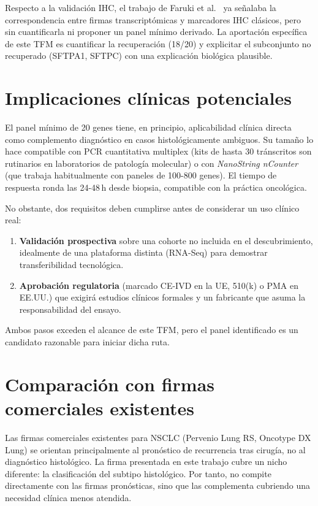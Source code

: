 Respecto a la validación IHC, el trabajo de Faruki et
al.~\cite{faruki2017lung} ya señalaba la correspondencia entre firmas
transcriptómicas y marcadores IHC clásicos, pero sin cuantificarla ni
proponer un panel mínimo derivado. La aportación específica de este TFM
es cuantificar la recuperación (18/20) y explicitar el subconjunto no
recuperado (SFTPA1, SFTPC) con una explicación biológica plausible.

\section{Implicaciones clínicas potenciales}
\label{sec:disc_clinico}

El panel mínimo de 20 genes tiene, en principio, aplicabilidad clínica
directa como complemento diagnóstico en casos histológicamente ambiguos.
Su tamaño lo hace compatible con PCR cuantitativa multiplex (kits de hasta
30 tránscritos son rutinarios en laboratorios de patología molecular) o
con \emph{NanoString nCounter} (que trabaja habitualmente con paneles de
100-800 genes). El tiempo de respuesta ronda las 24-48\,h desde biopsia,
compatible con la práctica oncológica.

No obstante, dos requisitos deben cumplirse antes de considerar un uso
clínico real:

\begin{enumerate}
  \item \textbf{Validación prospectiva} sobre una cohorte no incluida en
  el descubrimiento, idealmente de una plataforma distinta (RNA-Seq) para
  demostrar transferibilidad tecnológica.
  \item \textbf{Aprobación regulatoria} (marcado CE-IVD en la UE, 510(k)
  o PMA en EE.UU.) que exigirá estudios clínicos formales y un
  fabricante que asuma la responsabilidad del ensayo.
\end{enumerate}

Ambos pasos exceden el alcance de este TFM, pero el panel identificado es
un candidato razonable para iniciar dicha ruta.

\section{Comparación con firmas comerciales existentes}
\label{sec:disc_comerciales}

Las firmas comerciales existentes para NSCLC (Pervenio Lung RS, Oncotype
DX Lung) se orientan principalmente al pronóstico de recurrencia tras
cirugía, no al diagnóstico histológico. La firma presentada en este
trabajo cubre un nicho diferente: la clasificación del subtipo
histológico. Por tanto, no compite directamente con las firmas
pronósticas, sino que las complementa cubriendo una necesidad clínica
menos atendida.

